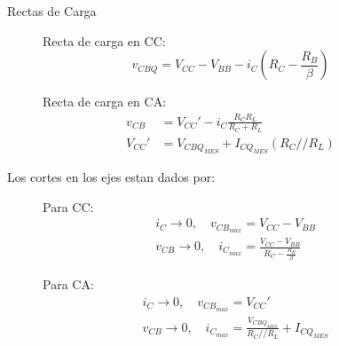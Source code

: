 \begin{frame}[allowframebreaks]{Rectas de Carga}
  \begin{figure}[!h]
    \begin{minipage}[t]{0.45\textwidth}
      Recta de carga en CC:
      \begin{equation*}
        v_{CBQ} = V_{CC} - V_{BB} - i_C \left(R_C - \frac{R_B}{\beta}\right)
      \end{equation*}
    \end{minipage}
    \hfill
    \begin{minipage}[t]{0.45\textwidth}
      Recta de carga en CA:
      \begin{align*}
        v_{CB} &= V_{CC}' - i_C \frac{R_C R_L}{R_C + R_L}\\[6pt]
        V_{CC}' &= V_{CBQ_{MES}} + I_{CQ_{MES}}(R_C // R_L)
      \end{align*}
    \end{minipage}
  \end{figure}
  Los cortes en los ejes estan dados por:
  \begin{figure}[!ht]
    \begin{minipage}{0.45\textwidth}
      Para CC:
      \small
      \begin{align*}
        &i_C \to 0, \quad v_{CB_{max}} = V_{CC} - V_{BB}\\[6pt]
        &v_{CB} \to 0, \quad i_{C_{max}} = \frac{V_{CC} - V_{BB}}{R_C - \frac{R_B}{\beta}}
      \end{align*}
    \end{minipage}
    \hfill
    \begin{minipage}{0.45\textwidth}
      Para CA:
      \small
      \begin{align*}
        &i_C \to 0, \quad v_{CB_{max}} = V_{CC}'\\[6pt]
        &v_{CB} \to 0, \quad i_{C_{max}} = \frac{V_{CBQ_{MES}}}{R_C // R_L} + I_{CQ_{MES}}
      \end{align*}
    \end{minipage}
  \end{figure}


\end{frame}
